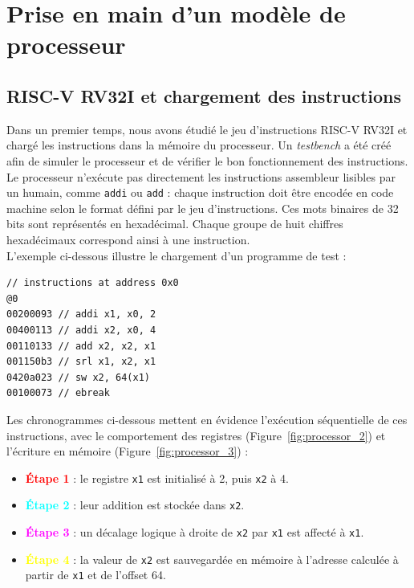 \section{Prise en main d'un modèle de processeur}

\subsection{RISC-V RV32I et chargement des instructions}

Dans un premier temps, nous avons étudié le jeu d'instructions RISC-V RV32I et chargé les instructions dans la mémoire du processeur. Un \textit{testbench} a été créé afin de simuler le processeur et de vérifier le bon fonctionnement des instructions. 
\\

Le processeur n'exécute pas directement les instructions assembleur lisibles par un humain, comme \texttt{addi} ou \texttt{add} : chaque instruction doit être encodée en code machine selon le format défini par le jeu d'instructions. Ces mots binaires de 32 bits sont représentés en hexadécimal. Chaque groupe de huit chiffres hexadécimaux correspond ainsi à une instruction.
\\

L'exemple ci-dessous illustre le chargement d'un programme de test :
\\

\begin{lstlisting}[caption={Exemple de chargement d'instructions}, label={lst:load_instructions}]
// instructions at address 0x0
@0
00200093 // addi x1, x0, 2
00400113 // addi x2, x0, 4
00110133 // add x2, x2, x1
001150b3 // srl x1, x2, x1
0420a023 // sw x2, 64(x1)
00100073 // ebreak
\end{lstlisting}

Les chronogrammes ci-dessous mettent en évidence l'exécution séquentielle de ces instructions, avec le comportement des registres (Figure~\ref{fig:processor_2}) et l'écriture en mémoire (Figure~\ref{fig:processor_3}) :
\begin{itemize}
    \item \textcolor{red}{\textbf{Étape 1}} : le registre \texttt{x1} est initialisé à 2, puis \texttt{x2} à 4.
    \item \textcolor{cyan}{\textbf{Étape 2}} : leur addition est stockée dans \texttt{x2}.
    \item \textcolor{magenta}{\textbf{Étape 3}} : un décalage logique à droite de \texttt{x2} par \texttt{x1} est affecté à \texttt{x1}.
    \item \textcolor{yellow}{\textbf{Étape 4}} : la valeur de \texttt{x2} est sauvegardée en mémoire à l’adresse calculée à partir de \texttt{x1} et de l’offset 64.
\end{itemize}

